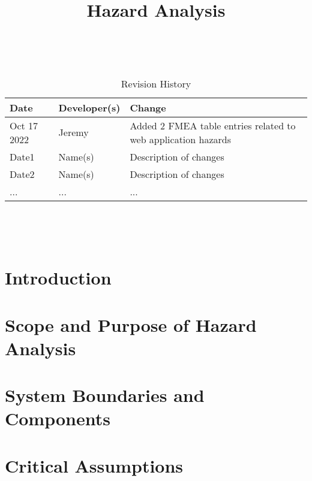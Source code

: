 \documentclass{article}
\title{Hazard Analysis\\\progname}
\author{\authname}
\date{}
\begin{document}
\maketitle
\thispagestyle{empty}

~\newpage


\begin{table}[hp]
\caption{Revision History} \label{TblRevisionHistory}
\begin{tabularx}{\textwidth}{llX}
\toprule
\textbf{Date} & \textbf{Developer(s)} & \textbf{Change}\\
\midrule
Oct 17 2022 & Jeremy & Added 2 FMEA table entries related to web application hazards\\
Date1 & Name(s) & Description of changes\\
Date2 & Name(s) & Description of changes\\
... & ... & ...\\
\bottomrule
\end{tabularx}
\end{table}

~\newpage

\tableofcontents

~\newpage



\section{Introduction}


\section{Scope and Purpose of Hazard Analysis}

\section{System Boundaries and Components}

\section{Critical Assumptions}

\end{document}
